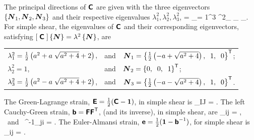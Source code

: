 The principal directions of $\mbox{\sffamily\bfseries C}$ are given with the 
three eigenvectors $\left\{ \mbox{\boldmath $N$}_1, \mbox{\boldmath $N$}_2, \mbox{\boldmath $N$}_3 \right\}$ and
their respective eigenvalues $\lambda^2_1, \lambda^2_2, \lambda^2_3$, 
\be
\tCbold = \dst\sum_{\alpha = 1}^3 \lambda^2_{\alpha} \vN_{\alpha} 
\otimes \vN_{\alpha}.
\ee
For simple shear, the eigenvalues of $\mbox{\sffamily\bfseries C}$ and their
corresponding eigenvectors, satisfying $[\;\mbox{\sffamily\bfseries C}\;] \left\{\mbox{\boldmath $N$} \right\} 
= \lambda^2 \left\{\mbox{\boldmath $N$}\right\}$, are
\be
\begin{tabular}{lll}
    $\lambda^2_1 = \half\left(a^2 + a \; \sqrt{a^2 + 4} + 2\right)$,
    & and & 
$\vN_1 = 
\left\{
    \half\left(-a + \sqrt{a^2 + 4} \right), \;\; 1, \;\; 0
\right\}\transpose$;
\\
$\lambda^2_2 = 1$,
    & and & 
$\vN_2 = 
\left\{
  0, \;\; 0, \;\; 1
\right\}\transpose$;
\\
    $\lambda^2_3 = \half\left(a^2 - a \; \sqrt{a^2 + 4} + 2\right)$,
    & and & 
$\vN_3 = 
\left\{
    \half\left(-a - \sqrt{a^2 + 4} \right), \;\; 1, \;\; 0
\right\}\transpose$.
\end{tabular}
\ee
%
The Green-Lagrange strain, $\mbox{\sffamily\bfseries E} = \frac{1}{2} (\mbox{\sffamily\bfseries C} - \mbox{\boldmath $1$})$, in simple shear is
\be
\tE_{IJ} = 
\half
{}.
\label{eq:E_IJ_simple_shear}
\ee
The left Cauchy-Green strain, $\mbox{\sffamily\bfseries b} = \mbox{\sffamily\bfseries F} \mbox{\sffamily\bfseries F} ^{\mbox{\scriptsize \sffamily T}}$, (and its inverse), in simple shear, are
\be
\tb_{ij} = 
, 
\;\;\mbox{ and } \;\;
\tb^{-1}_{ji} = 
.
\label{eq:b_ij_simple_shear}
\ee
The Euler-Almansi strain, $\mbox{\sffamily\bfseries e} = \frac{1}{2}(\mbox{\boldmath $1$} - \mbox{\sffamily\bfseries b}^{-1})$, for simple shear is
\be
\te_{ij} = 
\half
{}.
\label{eq:e_ij_simple_shear}
\ee

